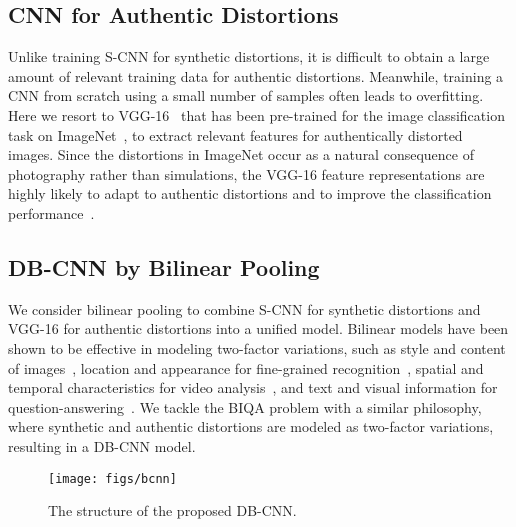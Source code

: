 \documentclass[journal]{IEEEtran}
\begin{document}
\subsection{CNN for Authentic Distortions}\label{subsec:bcnn}
 Unlike training S-CNN for synthetic distortions, it is difficult to obtain a large amount of relevant training data for authentic distortions. Meanwhile, training a CNN from scratch using a small number of samples often leads to overfitting. Here we resort to VGG-16~\cite{simonyan2014very} that has been pre-trained for the image classification task on ImageNet~\cite{deng2009imagenet}, to extract relevant features for authentically distorted images. Since the distortions in ImageNet occur as a natural consequence of photography rather than simulations, the VGG-16 feature representations are highly likely to adapt to authentic distortions and 	to improve the classification performance~\cite{kim2017deep}.




























\subsection{DB-CNN by Bilinear Pooling}
We consider bilinear pooling to combine S-CNN for synthetic distortions and VGG-16 for authentic distortions into a unified model. Bilinear models have been shown to be effective in modeling two-factor variations, such as style and content of images~\cite{tenenbaum1997separating}, location and appearance for fine-grained recognition~\cite{lin2015bilinear}, spatial and temporal characteristics for video analysis~\cite{simonyan2014two}, and text and visual information for question-answering~\cite{fukui2016multimodal}. We tackle the BIQA problem with a similar philosophy, where synthetic and authentic distortions are modeled as two-factor variations, resulting in a DB-CNN model.

\begin{figure*}
  \centering
  \texttt{[image: figs/bcnn]}
  \caption{The structure of the proposed DB-CNN.}\label{fig:bcnn}
\end{figure*}
\end{document}
